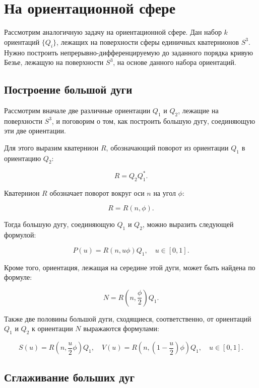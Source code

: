 \section{На ориентационной сфере}

Рассмотрим аналогичную задачу на ориентационной сфере. Дан набор $k$ ориентаций $\{Q_i\}$, лежащих на поверхности сферы
единичных кватернионов $S^3$. Нужно построить непрерывно-дифференцируемую до заданного порядка кривую Безье, лежащую
на поверхности $S^3$, на основе данного набора ориентаций.

\subsection*{Построение большой дуги}

Рассмотрим вначале две различные ориентации $Q_1$ и $Q_2$, лежащие на поверхности $S^3$, и поговорим о том, как
построить большую дугу, соединяющую эти две ориентации.

Для этого выразим кватернион $R$, обозначающий поворот из ориентации $Q_1$ в ориентацию $Q_2$:

$$
R=Q_2Q_1^*.
$$

Кватернион $R$ обозначает поворот вокруг оси $n$ на угол $\phi$:

$$
R=R(n,\phi).
$$

Тогда большую дугу, соединяющую $Q_1$ и $Q_2$, можно выразить следующей формулой:

\begin{equation}
P(u)=R(n,u\phi)Q_1, \quad u \in [0,1].
\label{orientation-big-arc}
\end{equation}

Кроме того, ориентация, лежащая на середине этой дуги, может быть найдена по формуле:

\begin{equation}
N=R(n,\frac{\phi}{2})Q_1.
\label{orientation-big-arc-mid}
\end{equation}

Также две половины большой дуги, сходящиеся, соответственно, от ориентаций $Q_1$ и $Q_2$ к ориентации $N$
выражаются формулами:

\begin{equation}
S(u)=R(n,\frac{u}{2}\phi)Q_1, \quad V(u)=R(n,(1-\frac{u}{2})\phi)Q_1, \quad u \in [0,1].
\label{orientation-big-arc-halfs}
\end{equation}

\subsection*{Сглаживание больших дуг}

